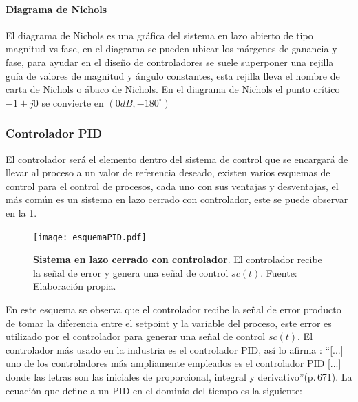             \paragraph{Diagrama de Nichols}
                
                El diagrama de Nichols es una gráfica del sistema en lazo abierto de tipo magnitud vs fase, en el diagrama se pueden ubicar los márgenes de ganancia y fase, para ayudar en el diseño de controladores se suele superponer una rejilla guía de valores de magnitud y ángulo constantes, esta rejilla lleva el nombre de carta de Nichols o ábaco de Nichols. En el diagrama de Nichols el punto crítico $-1 + j0$ se convierte en $(0dB, -180^\circ)$

                \clearpage

        \subsubsection{Controlador PID}

            El controlador será el elemento dentro del sistema de control que se encargará de llevar al proceso a un valor de referencia deseado, existen varios esquemas de control para el control de procesos, cada uno con sus ventajas y desventajas, el más común es un sistema en lazo cerrado con controlador, este se puede observar en la \cref{fig:esquemaPID}.

            \begin{figure}[htb]
                \centering
                \texttt{[image: esquemaPID.pdf]}
                \caption[Ejemplo de un sistema en lazo cerrado con controlador]{\textbf{Sistema en lazo cerrado con controlador}. El controlador recibe la señal de error y genera una señal de control $sc(t)$. Fuente: Elaboración propia.} 
                \label{fig:esquemaPID}
            \end{figure}

            En este esquema se observa que el controlador recibe la señal de error producto de tomar la diferencia entre el setpoint y la variable del proceso, este error es utilizado por el controlador para generar una señal de control $sc(t)$. El controlador más usado en la industria es el controlador PID, así lo afirma \textcite{kuo1996sistemas}: \enquote{[...] uno de los controladores más ampliamente empleados es el controlador PID [...] donde las letras son las iniciales de proporcional, integral y derivativo}(p.$\,$671). La ecuación que define a un PID en el dominio del tiempo es la siguiente:

